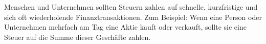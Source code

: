 Menschen und Unternehmen sollten Steuern zahlen auf schnelle, kurzfristige und sich oft wiederholende Finanztransaktionen.
Zum Beispiel: Wenn eine Person oder Unternehmen mehrfach am Tag eine Aktie kauft oder verkauft, sollte sie eine Steuer auf die Summe dieser Geschäfte zahlen.